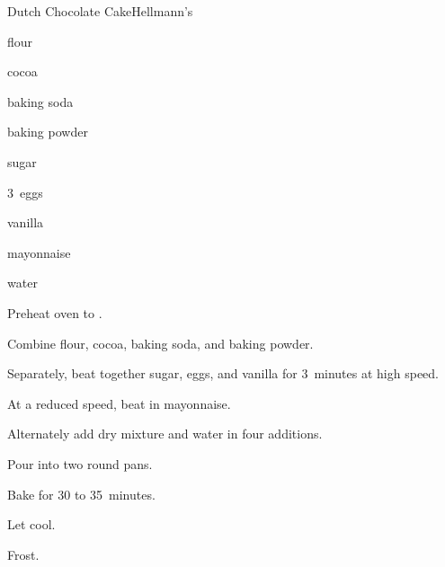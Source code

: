 \begin{recipe}{Dutch Chocolate Cake}{Hellmann's}{}

\begin{ingredients}
\item {} flour
\item \C{\twothird} cocoa
\item \tp{1\quarter} baking soda
\item \tp{\quarter} baking powder
\item \C{1\twothird} sugar
\item 3~eggs
\item {} vanilla
\item {} mayonnaise
\item \C{1\third} water 
\end{ingredients}

\begin{directions}
\item Preheat oven to .
\item Combine flour, cocoa, baking soda, and baking powder.
\item Separately, beat together sugar, eggs, and vanilla for 3~minutes at high speed.
\item At a reduced speed, beat in mayonnaise.
\item Alternately add dry mixture and water in four additions.
\item Pour into two  round pans.
\item Bake for 30 to 35~minutes.
\item Let cool.
\item Frost.
\end{directions}

\end{recipe}
